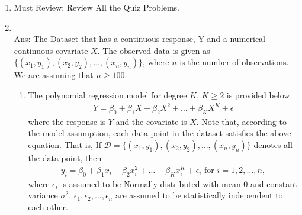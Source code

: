 \documentclass[12pt]{article}
\begin{document}
\begin{enumerate}
\item {\Large Must Review: Review All the Quiz Problems.}
\item {}\\

Ans: The Dataset that has a continuous response, Y and a numerical continuous covariate $X$.  The observed data is given as $\{(x_1, y_1), (x_2,y_2), \ldots , (x_n, y_n)\}$, where $n$ is the number of observations.  We are assuming that $n\geq 100$.  

\begin{enumerate}
\item The polynomial regression model for degree $K$, $K\geq 2$ is provided below:
\begin{eqnarray*}
Y= \beta_0+\beta_1X+ \beta_2 X^2 + \ldots +\beta_KX^K+ \epsilon \nonumber
\end{eqnarray*}
where the response is $Y$ and the covariate is $X$.  Note that, according to the model assumption,  each data-point in the dataset satisfies the above equation. That is,   If $\mathcal{D}= \{(x_1, y_1), (x_2,y_2), \ldots , (x_n, y_n)\}$ denotes all the data point, then 
\begin{eqnarray*}
y_i= \beta_0+\beta_1x_i+ \beta_2 x_i^2 + \ldots +\beta_Kx_i^K+ \epsilon_i \text{ for } i =1 , 2, \ldots, n, 
\end{eqnarray*}
where $\epsilon_i$ is assumed to be Normally distributed with mean 0 and constant variance $\sigma^2$.  $\epsilon_1, \epsilon_2, \ldots, \epsilon_n$ are assumed to be  statistically independent to each other. 


\end{enumerate}
\end{enumerate}
\end{document}
